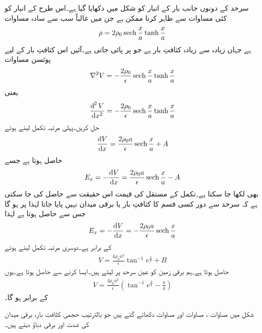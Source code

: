 سرحد کے دونوں جانب بار کے انبار کو شکل میں دکھایا گیا ہے۔اس طرح کے انبار کو کئی مساوات سے ظاہر کرنا ممکن ہے جن میں غالباً سب سے سادہ مساوات
\begin{align}\label{مساوات_لاپلاس_ڈایوڈ_بار-کثافت}
\rho=2 \rho_0 \operatorname{sech} \frac{x}{a} \tanh \frac{x}{a}
\end{align}
ہے جہاں زیادہ سے زیادہ کثافتِ بار  ہے جو  پر پائی جاتی ہے۔آئیں اس کثافتِ بار کے لیے پوئسن مساوات
\begin{align*}
\nabla^2 V=-\frac{2 \rho_0}{\epsilon} \operatorname{sech} \frac{x}{a} \tanh \frac{x}{a}
\end{align*}
یعنی
\begin{align*}
\frac{\dif^{\hspace{1pt}2} V}{\dif x^2}=-\frac{2 \rho_0}{\epsilon} \sech \frac{x}{a} \tanh \frac{x}{a}
\end{align*}
 حل کریں۔پہلی مرتبہ تکمل لیتے ہوئے
\begin{align*}
\frac{\dif V}{\dif x}=\frac{2\rho_0 a}{\epsilon} \sech \frac{x}{a}+A
\end{align*}
حاصل ہوتا  ہے جسے
\begin{align*}
E_x=-\frac{\dif V}{\dif x}=\frac{2\rho_0 a}{\epsilon} \sech \frac{x}{a}-A
\end{align*}
بھی لکھا جا سکتا ہے۔تکمل کے مستقل  کی قیمت اس حقیقت سے حاصل کی جا سکتی ہے کہ سرحد سے دور کسی قسم کا کثافتِ بار یا برقی میدان نہیں پایا جاتا لہٰذا  پر  ہو گا جس سے  حاصل ہوتا ہے لہٰذا
 \begin{align}\label{مساوات_لاپلاس_ڈایوڈ_برقی_میدان}
E_x=-\frac{\dif V}{\dif x}=-\frac{2\rho_0 a}{\epsilon} \sech \frac{x}{a}
\end{align}
کے برابر ہے۔دوسری مرتبہ تکمل لیتے ہوئے
\begin{align*}
V=\frac{4 \rho_0 a^2}{\epsilon} \tan^{-1} e^{\frac{x}{a}}+B
\end{align*}
حاصل ہوتا ہے۔ہم برقی زمین کو عین سرحد پر لیتے ہیں۔ایسا کرنے سے  حاصل ہوتا ہے۔یوں
\begin{align}\label{مساوات_لاپلاس_ڈایوڈ_برقی_دباو}
V=\frac{4 \rho_0 a^2}{\epsilon} \left(\tan^{-1} e^{\frac{x}{a}}-\frac{\pi}{4}\right)
\end{align}
کے برابر ہو گا۔

شکل میں مساوات ، مساوات  اور مساوات  دکھائے گئے ہیں جو بالترتیب حجمی کثافتِ بار، برقی میدان کی شدت اور برقی دباؤ دیتے ہیں۔

